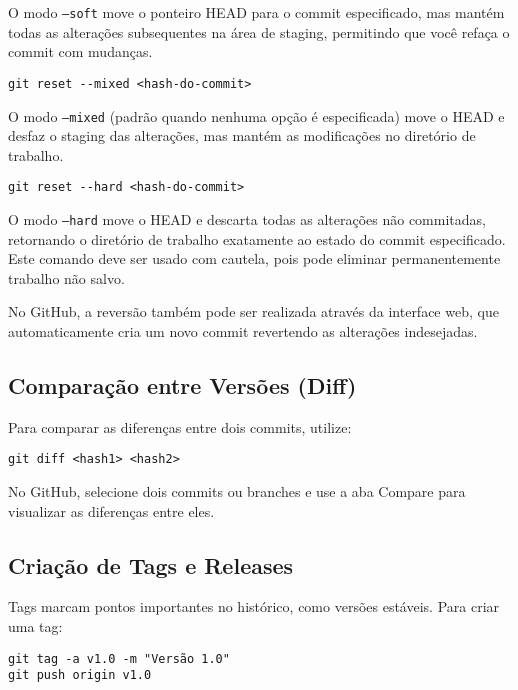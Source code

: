 O modo \texttt{--soft} move o ponteiro HEAD para o commit especificado, mas mantém todas as alterações subsequentes na área de staging, permitindo que você refaça o commit com mudanças.

\begin{lstlisting}[style=shellstyle]
git reset --mixed <hash-do-commit>
\end{lstlisting}

O modo \texttt{--mixed} (padrão quando nenhuma opção é especificada) move o HEAD e desfaz o staging das alterações, mas mantém as modificações no diretório de trabalho.

\begin{lstlisting}[style=shellstyle]
git reset --hard <hash-do-commit>
\end{lstlisting}

O modo \texttt{--hard} move o HEAD e descarta todas as alterações não commitadas, retornando o diretório de trabalho exatamente ao estado do commit especificado. Este comando deve ser usado com cautela, pois pode eliminar permanentemente trabalho não salvo.

No GitHub, a reversão também pode ser realizada através da interface web, que automaticamente cria um novo commit revertendo as alterações indesejadas.

\subsection{Comparação entre Versões (Diff)}

Para comparar as diferenças entre dois commits, utilize:

\begin{lstlisting}[style=shellstyle]
git diff <hash1> <hash2>
\end{lstlisting}

No GitHub, selecione dois commits ou branches e use a aba Compare para visualizar as diferenças entre eles.

\subsection{Criação de Tags e Releases}

Tags marcam pontos importantes no histórico, como versões estáveis. Para criar uma tag:

\begin{lstlisting}[style=shellstyle]
git tag -a v1.0 -m "Versão 1.0"
git push origin v1.0
\end{lstlisting}

